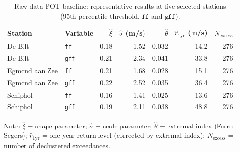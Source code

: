 \begin{table}[h]
    \centering
    \caption{Raw-data POT baseline: representative results at five selected stations (95th-percentile threshold, $\texttt{ff}$ and $\texttt{gff}$).}
    \label{tab:evt_summary}
    \begin{tabular}{llrrrrr}
        \toprule
        \textbf{Station} & \textbf{Variable} & $\hat{\xi}$ & $\hat{\sigma}$ (m/s) & $\hat{\theta}$ & $\hat{r}_{1\text{yr}}$ (m/s) & $N_{\text{excess}}$ \\
        \midrule
        De Bilt          & \texttt{ff}       & 0.18        & 1.52                 & 0.032          & 14.2                         & 276                 \\
        De Bilt          & \texttt{gff}      & 0.21        & 2.34                 & 0.041          & 33.8                         & 276                 \\
        Egmond aan Zee   & \texttt{ff}       & 0.21        & 1.68                 & 0.028          & 15.1                         & 276                 \\
        Egmond aan Zee   & \texttt{gff}      & 0.22        & 2.52                 & 0.035          & 36.4                         & 276                 \\
        Schiphol         & \texttt{ff}       & 0.16        & 1.41                 & 0.025          & 13.6                         & 276                 \\
        Schiphol         & \texttt{gff}      & 0.19        & 2.11                 & 0.038          & 48.8                         & 276                 \\
        \bottomrule
    \end{tabular}
\end{table}

\noindent Note: $\hat{\xi}$ = shape parameter; $\hat{\sigma}$ = scale parameter; $\hat{\theta}$ = extremal index (Ferro--Segers); $\hat{r}_{1\text{yr}}$ = one-year return level (corrected by extremal index); $N_{\text{excess}}$ = number of declustered exceedances.

